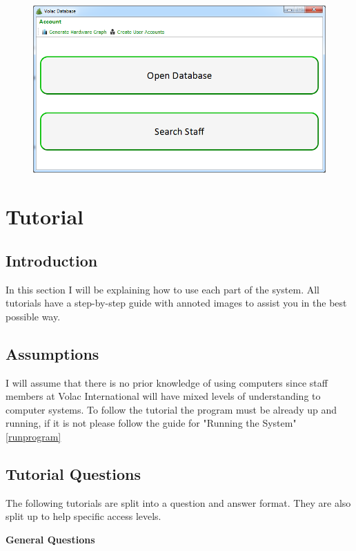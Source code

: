 \begin{figure}[H]
    \includegraphics[width=\textwidth]{./Manual/Images/run7.png}
\end{figure}

\section{Tutorial}

\subsection{Introduction}

In this section I will be explaining how to use each part of the system. All tutorials have a step-by-step guide with annoted images to assist you in the best possible way.

\subsection{Assumptions}

I will assume that there is no prior knowledge of using computers since staff members at Volac International will have mixed levels of understanding to computer systems. To follow the tutorial the program must be already up and running, if it is not please follow the guide for "Running the System" \ref{runprogram}

\subsection{Tutorial Questions}

The following tutorials are split into a question and answer format. They are also split up to help specific access levels.

\textbf{General Questions}

